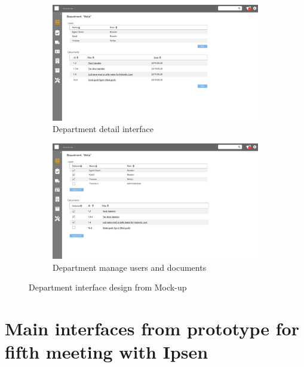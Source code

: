 \begin{figure}[H]\ContinuedFloat
	\centering
	\begin{subfigure}[b]{0.48\textwidth}
		\includegraphics[width=\textwidth]{billeder/iteration3Prototyper/Page_25.jpg}
		\caption{Department detail interface}
		\label{fig:5-DepDetail}
	\end{subfigure}
	\quad
	\begin{subfigure}[b]{0.48\textwidth}
		\includegraphics[width=\textwidth]{billeder/iteration3Prototyper/Page_26.jpg}
		\caption{Department manage users and documents}
		\label{fig:5-DepEdit}
	\end{subfigure}
	\caption{Department interface design from Mock-up}\label{fig:5-DepMockUp}
\end{figure}

\section{Main interfaces from prototype for fifth meeting with Ipsen}\label{sec:3prototype}
